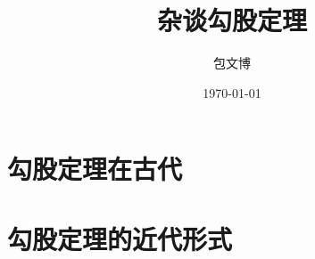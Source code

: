 \documentclass[UTF8]{ctexart}
\title{杂谈勾股定理}
\author{包文博}
\date{\today}
\begin{document}
	\tableofcontents
	\section{勾股定理在古代}
	\section{勾股定理的近代形式}
	
	
\end{document}
